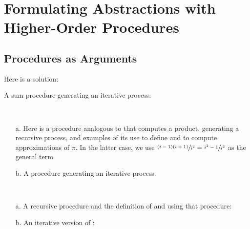 \section{Formulating Abstractions with Higher-Order Procedures}

\subsection{Procedures as Arguments}

\begin{exe}[1.29]
    Here is a solution:
\end{exe}

\begin{exe}[1.30]
    A sum procedure generating an iterative process:
\end{exe}

\begin{exe}[1.31]
    \ \vspace{-20pt}
    \begin{itemize}
        \item[a.] Here is a procedure analogous to  that computes 
            a product, generating a recursive process, and examples of its use 
            to define  and to compute approximations of $\pi$. 
            In the latter case, we use $\sfrac{(i - 1)(i + 1)}{i^2} = \sfrac{i^2 
            - 1}{i^2}$ as the general term.
        \item[b.] A  procedure generating an iterative process.
    \end{itemize}
\end{exe}

\begin{exe}[1.32]
    \ \vspace{-20pt}
    \begin{itemize}
        \item[a.] A recursive  procedure and the definition of 
             and  using that procedure:
        \item[b.] An iterative version of :
    \end{itemize}
\end{exe}

